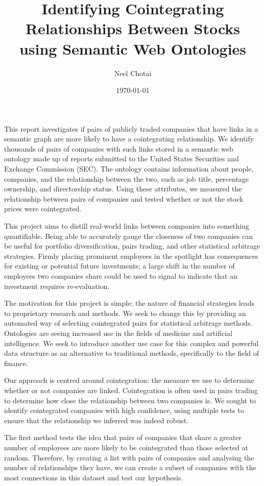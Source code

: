\documentclass{UoYCSproject}
\author{Neel Chotai}
\title{Identifying Cointegrating Relationships Between Stocks using Semantic Web Ontologies}
\date{\today}
\begin{document}
\maketitle
\listoffigures
\listoftables

\begin{summary}
This report investigates if pairs of publicly traded companies that have links in a semantic graph are more likely to have a cointegrating relationship. We identify thousands of pairs of companies with such links stored in a semantic web ontology made up of reports submitted to the United States Securities and Exchange Commission (SEC). The ontology contains information about people, companies, and the relationship between the two, such as job title, percentage ownership, and directorship status. Using these attributes, we measured the relationship between pairs of companies and tested whether or not the stock prices were cointegrated.

This project aims to distill real-world links between companies into something quantifiable. Being able to accurately gauge the closeness of two companies can be useful for portfolio diversification, pairs trading, and other statistical arbitrage strategies. Firmly placing prominent employees in the spotlight has consequences for existing or potential future investments; a large shift in the number of employees two companies share could be used to signal to indicate that an investment requires re-evaluation.

The motivation for this project is simple: the nature of financial strategies leads to proprietary research and methods. We seek to change this by providing an automated way of selecting cointegrated pairs for statistical arbitrage methods. Ontologies are seeing increased use in the fields of medicine and artificial intelligence. We seek to introduce another use case for this complex and powerful data structure as an alternative to traditional methods, specifically to the field of finance.

Our approach is centred around cointegration: the measure we use to determine whether or not companies are linked. Cointegration is often used in pairs trading to determine how close the relationship between two companies is. We sought to identify cointegrated companies with high confidence, using multiple tests to ensure that the relationship we inferred was indeed robust.

The first method tests the idea that pairs of companies that share a greater number of employees are more likely to be cointegrated than those selected at random. Therefore, by creating a list with pairs of companies and analysing the number of relationships they have, we can create a subset of companies with the most connections in this dataset and test our hypothesis.


\end{summary}
\end{document}
